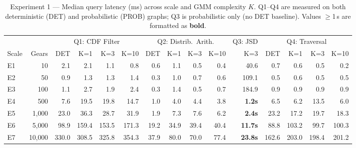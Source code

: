 \begin{table}[t]
\centering
\small
\caption{Experiment 1 — Median query latency (ms) across scale and GMM complexity $K$. Q1--Q4 are measured on both deterministic (DET) and probabilistic (PROB) graphs; Q3 is probabilistic only (no DET baseline). Values $\geq$1\,s are formatted as \textbf{bold}.}
\label{tab:exp1_latency}
\setlength{\tabcolsep}{4pt}
\begin{tabular}{lr|rrrr|rrrr|r|rrrr}
\toprule
 & & \multicolumn{4}{c|}{Q1: CDF Filter} & \multicolumn{4}{c|}{Q2: Distrib.\ Arith.} & Q3: JSD & \multicolumn{4}{c}{Q4: Traversal} \\
\cmidrule(lr){3-6}\cmidrule(lr){7-10}\cmidrule(lr){11-11}\cmidrule(lr){12-15}
Scale & Gears & DET & K=1 & K=3 & K=10 & DET & K=1 & K=3 & K=10 & K=3 & DET & K=1 & K=3 & K=10 \\
\midrule
E1 & 10 & 2.1 & 2.1 & 1.1 & 0.8 & 0.6 & 1.1 & 0.5 & 0.4 & 40.6 & 0.7 & 0.6 & 0.5 & 0.2 \\
E2 & 50 & 0.9 & 1.3 & 1.3 & 1.4 & 0.3 & 1.0 & 0.7 & 0.6 & 109.1 & 0.5 & 0.6 & 0.5 & 0.5 \\
E3 & 100 & 1.1 & 2.7 & 1.9 & 2.4 & 0.3 & 1.4 & 0.5 & 0.7 & 184.9 & 0.9 & 0.9 & 0.9 & 0.9 \\
E4 & 500 & 7.6 & 19.5 & 19.8 & 14.7 & 1.0 & 4.0 & 4.4 & 3.8 & \textbf{1.2s} & 6.5 & 6.2 & 13.5 & 6.0 \\
E5 & 1,000 & 23.0 & 36.3 & 28.7 & 31.9 & 1.9 & 7.3 & 7.6 & 6.2 & \textbf{2.4s} & 23.2 & 17.2 & 19.7 & 18.3 \\
E6 & 5,000 & 98.9 & 159.4 & 153.5 & 171.3 & 19.2 & 34.9 & 39.4 & 40.4 & \textbf{11.7s} & 88.8 & 103.2 & 99.7 & 100.3 \\
E7 & 10,000 & 330.0 & 308.5 & 325.8 & 354.3 & 37.9 & 80.0 & 70.0 & 77.4 & \textbf{23.8s} & 162.6 & 203.0 & 198.4 & 201.2 \\
\bottomrule
\end{tabular}
\end{table}
